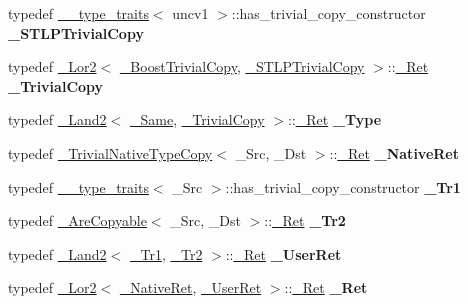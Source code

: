 \begin{DoxyCompactItemize}
\mbox{\label{struct___trivial_u_copy_aaa62fe1b745b448560476bcbb2f1de60}} 
typedef \hyperlink{struct____type__traits}{\+\_\+\+\_\+type\+\_\+traits}$<$ uncv1 $>$\+::has\+\_\+trivial\+\_\+copy\+\_\+constructor {\bfseries \+\_\+\+S\+T\+L\+P\+Trivial\+Copy}
\item 
\mbox{\label{struct___trivial_u_copy_ac81e4e7b33fe77c6b776bbf114c39fa5}} 
typedef \hyperlink{struct___lor2}{\+\_\+\+Lor2}$<$ \hyperlink{struct____true__type}{\+\_\+\+Boost\+Trivial\+Copy}, \hyperlink{struct____true__type}{\+\_\+\+S\+T\+L\+P\+Trivial\+Copy} $>$\+::\hyperlink{struct____true__type}{\+\_\+\+Ret} {\bfseries \+\_\+\+Trivial\+Copy}
\item 
\mbox{\label{struct___trivial_u_copy_ac8810081159cbab8e12168bf44af24c7}} 
typedef \hyperlink{struct___land2}{\+\_\+\+Land2}$<$ \hyperlink{struct____true__type}{\+\_\+\+Same}, \hyperlink{struct____true__type}{\+\_\+\+Trivial\+Copy} $>$\+::\hyperlink{struct____true__type}{\+\_\+\+Ret} {\bfseries \+\_\+\+Type}
\item 
\mbox{\label{struct___trivial_u_copy_a340eb75738213fa87f8225c22c0c7369}} 
typedef \hyperlink{struct___trivial_native_type_copy}{\+\_\+\+Trivial\+Native\+Type\+Copy}$<$ \+\_\+\+Src, \+\_\+\+Dst $>$\+::\hyperlink{struct____true__type}{\+\_\+\+Ret} {\bfseries \+\_\+\+Native\+Ret}
\item 
\mbox{\label{struct___trivial_u_copy_a6110b6ade42a2555c32a29f08ece669e}} 
typedef \hyperlink{struct____type__traits}{\+\_\+\+\_\+type\+\_\+traits}$<$ \+\_\+\+Src $>$\+::has\+\_\+trivial\+\_\+copy\+\_\+constructor {\bfseries \+\_\+\+Tr1}
\item 
\mbox{\label{struct___trivial_u_copy_ad7e36e43fa449159ee54057ce708d186}} 
typedef \hyperlink{struct___are_copyable}{\+\_\+\+Are\+Copyable}$<$ \+\_\+\+Src, \+\_\+\+Dst $>$\+::\hyperlink{struct____true__type}{\+\_\+\+Ret} {\bfseries \+\_\+\+Tr2}
\item 
\mbox{\label{struct___trivial_u_copy_ab63cd4243148270de402d40c4a45b650}} 
typedef \hyperlink{struct___land2}{\+\_\+\+Land2}$<$ \hyperlink{struct____true__type}{\+\_\+\+Tr1}, \hyperlink{struct____true__type}{\+\_\+\+Tr2} $>$\+::\hyperlink{struct____true__type}{\+\_\+\+Ret} {\bfseries \+\_\+\+User\+Ret}
\item 
\mbox{\label{struct___trivial_u_copy_a45a2b2586e0b7b96100c49d503e34e6c}} 
typedef \hyperlink{struct___lor2}{\+\_\+\+Lor2}$<$ \hyperlink{struct____true__type}{\+\_\+\+Native\+Ret}, \hyperlink{struct____false__type}{\+\_\+\+User\+Ret} $>$\+::\hyperlink{struct____true__type}{\+\_\+\+Ret} {\bfseries \+\_\+\+Ret}
\end{DoxyCompactItemize}
